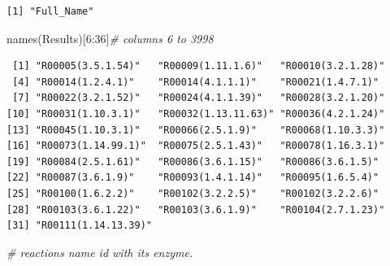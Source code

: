 \documentclass[
  letterpaper,
  DIV=11,
  numbers=noendperiod]{scrreprt}
\newenvironment{Shaded}{}{}
\newcommand{\AttributeTok}[1]{\textcolor[rgb]{0.78,0.47,0.87}{#1}}
\newcommand{\CommentTok}[1]{\textcolor[rgb]{0.36,0.39,0.44}{\textit{#1}}}
\newcommand{\DecValTok}[1]{\textcolor[rgb]{0.82,0.60,0.40}{#1}}
\newcommand{\FunctionTok}[1]{\textcolor[rgb]{0.38,0.69,0.94}{#1}}
\newcommand{\NormalTok}[1]{\textcolor[rgb]{0.67,0.70,0.75}{#1}}
\newcommand{\OtherTok}[1]{\textcolor[rgb]{0.15,0.68,0.38}{#1}}
\newcommand{\SpecialCharTok}[1]{\textcolor[rgb]{0.34,0.71,0.76}{#1}}
\newcommand{\StringTok}[1]{\textcolor[rgb]{0.60,0.76,0.47}{#1}}
\begin{document}
\begin{verbatim}
[1] "Full_Name"
\end{verbatim}

\begin{Shaded}
\begin{Highlighting}[]
\FunctionTok{names}\NormalTok{(Results)[}\DecValTok{6}\SpecialCharTok{:}\DecValTok{36}\NormalTok{]}\CommentTok{\# columns 6 to 3998 }
\end{Highlighting}
\end{Shaded}

\begin{verbatim}
 [1] "R00005(3.5.1.54)"   "R00009(1.11.1.6)"   "R00010(3.2.1.28)"  
 [4] "R00014(1.2.4.1)"    "R00014(4.1.1.1)"    "R00021(1.4.7.1)"   
 [7] "R00022(3.2.1.52)"   "R00024(4.1.1.39)"   "R00028(3.2.1.20)"  
[10] "R00031(1.10.3.1)"   "R00032(1.13.11.63)" "R00036(4.2.1.24)"  
[13] "R00045(1.10.3.1)"   "R00066(2.5.1.9)"    "R00068(1.10.3.3)"  
[16] "R00073(1.14.99.1)"  "R00075(2.5.1.43)"   "R00078(1.16.3.1)"  
[19] "R00084(2.5.1.61)"   "R00086(3.6.1.15)"   "R00086(3.6.1.5)"   
[22] "R00087(3.6.1.9)"    "R00093(1.4.1.14)"   "R00095(1.6.5.4)"   
[25] "R00100(1.6.2.2)"    "R00102(3.2.2.5)"    "R00102(3.2.2.6)"   
[28] "R00103(3.6.1.22)"   "R00103(3.6.1.9)"    "R00104(2.7.1.23)"  
[31] "R00111(1.14.13.39)"
\end{verbatim}

\begin{Shaded}
\begin{Highlighting}[]
\CommentTok{\# reactions name id with its enzyme.}
\end{Highlighting}
\end{Shaded}

\begin{Shaded}
\end{Shaded}
\end{document}
